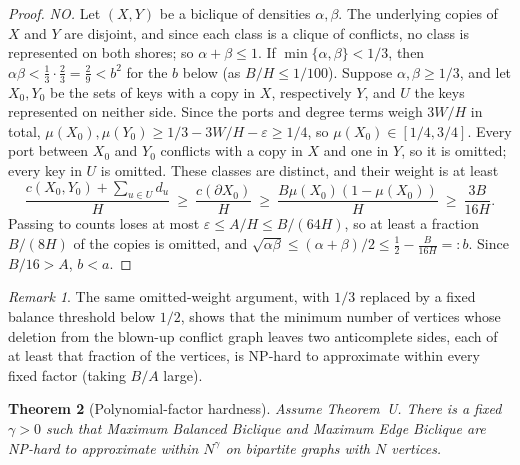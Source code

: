 \documentclass[11pt,letterpaper]{article}
\newtheorem{theorem}{Theorem}[section]
\theoremstyle{definition}
\theoremstyle{remark}
\newtheorem{remark}[theorem]{Remark}
\newcommand{\eps}{\varepsilon}
\begin{document}
\begin{proof}
\emph{NO.} Let \((X,Y)\) be a biclique of densities \(\alpha,\beta\). The
underlying copies of \(X\) and \(Y\) are disjoint, and since each class is a
clique of conflicts, no class is represented on both shores; so
\(\alpha+\beta\le1\). If \(\min\{\alpha,\beta\}<1/3\), then
\(\alpha\beta<\frac13\cdot\frac23=\frac29<b^2\) for the \(b\) below (as
\(B/H\le1/100\)). Suppose \(\alpha,\beta\ge1/3\), and let \(X_0,Y_0\) be the
sets of keys with a copy in \(X\), respectively \(Y\), and \(U\) the keys
represented on neither side. Since the ports and degree terms weigh \(3W/H\)
in total, \(\mu(X_0),\mu(Y_0)\ge1/3-3W/H-\eps\ge1/4\), so
\(\mu(X_0)\in[1/4,3/4]\). Every port between \(X_0\) and \(Y_0\) conflicts
with a copy in \(X\) and one in \(Y\), so it is omitted; every key in \(U\)
is omitted. These classes are distinct, and their weight is at least
\[
\frac{c(X_0,Y_0)+\sum_{u\in U}d_u}{H}\ \ge\ \frac{c(\partial X_0)}{H}
\ \ge\ \frac{B\mu(X_0)(1-\mu(X_0))}H\ \ge\ \frac{3B}{16H}.
\]
Passing to counts loses at most \(\eps\le A/H\le B/(64H)\), so at least a
fraction \(B/(8H)\) of the copies is omitted, and
\(\sqrt{\alpha\beta}\le(\alpha+\beta)/2\le\frac12-\frac B{16H}=:b\). Since
\(B/16>A\), \(b<a\).
\end{proof}

\begin{remark}
The same omitted-weight argument, with \(1/3\) replaced by a fixed balance
threshold below \(1/2\), shows that the minimum number of vertices whose
deletion from the blown-up conflict graph leaves two anticomplete sides,
each of at least that fraction of the vertices, is NP-hard to approximate
within every fixed factor (taking \(B/A\) large).
\end{remark}

\begin{theorem}[Polynomial-factor hardness]\label{th:biclique}
Assume Theorem~U. There is a fixed \(\gamma>0\) such that Maximum Balanced
Biclique and Maximum Edge Biclique are NP-hard to approximate within
\(N^\gamma\) on bipartite graphs with \(N\) vertices.
\end{theorem}
\end{document}
